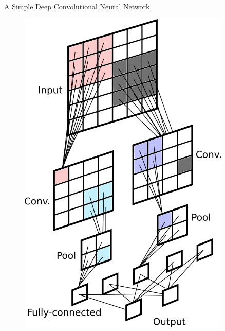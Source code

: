 \documentclass[final,hyperref={pdfpagelabels=false}]{beamer}
\begin{document}
\begin{frame}
\begin{columns}[T]
\begin{column}{.32\textwidth}
      \begin{block}{A Simple Deep Convolutional Neural Network}
        \begin{figure}
          \includegraphics[width=0.9\textwidth]{images/svg/convnet.png}
        \end{figure}


      \end{block}
    \end{column}


\end{columns}
\end{frame}
\end{document}
